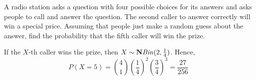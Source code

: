 \begin{example}
    A radio station asks a question with four possible choices for its answers
and asks people to call and answer the question. The second caller to answer
correctly will win a special price. Assuming that people just make a random
guess about the answer, find the probability that the fifth caller will win the
prize. 
\end{example}
\begin{solution}
    If the $X$-th caller wins the prize, then $X \sim
\text{$\mathbf{N}$\emph{Bin}}(2, \frac{1}{4})$. Hence, 
    \[ P(X = 5) = {4 \choose 1} (\frac{1}{4})^2 (\frac{3}{4})^3
                = \frac{27}{256}                                            \]
\end{solution}